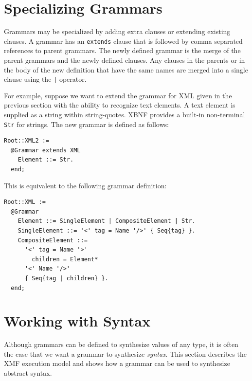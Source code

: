 \documentclass{article}
\begin{document}
\section{Specializing Grammars}

Grammars may be specialized by adding extra clauses or extending existing clauses.
A grammar has an {\tt extends} clause that is followed by comma separated
references to parent grammars. The newly defined grammar is the merge of the
parent grammars and the newly defined clauses. Any clauses in the parents or
in the body of the new definition that have the same names are merged into a single
clause using the {\tt |} operator.

For example, suppose we want to extend the grammar for XML given in the previous
section with the ability to recognize text elements. A text element is supplied
as a string within string-quotes. XBNF provides a built-in non-terminal {\tt Str} for
strings. The new grammar is defined as follows:
\begin{verbatim}
Root::XML2 := 
  @Grammar extends XML 
    Element ::= Str. 
  end;
\end{verbatim}
This is equivalent to the following grammar definition:
\begin{verbatim}
Root::XML :=
  @Grammar
    Element ::= SingleElement | CompositeElement | Str.  
    SingleElement ::= '<' tag = Name '/>' { Seq{tag} }.
    CompositeElement ::= 
      '<' tag = Name '>' 
        children = Element*  
      '<' Name '/>' 
      { Seq{tag | children} }. 
  end; 
\end{verbatim}

\section{Working with Syntax}

Although grammars can be defined to synthesize values of any type, it is
often the case that we want a grammar to synthesize {\em syntax}. This
section describes the XMF execution model and shows how a grammar can be 
used to synthesize abstract syntax.
\end{document}
